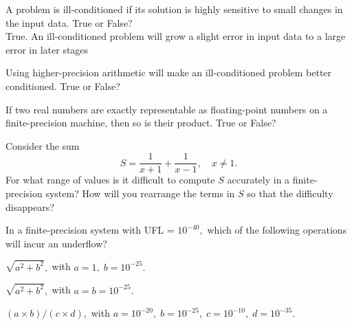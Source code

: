 \item
\benum
\item A problem is ill-conditioned if its solution is highly sensitive to small changes in the input data.  True or False? \\
	True. An ill-conditioned problem will grow a slight error in input data to a large error in later stages

\item Using higher-precision arithmetic will make an ill-conditioned problem better conditioned.  True or False?
\item  If two real numbers are exactly representable as floating-point numbers on a finite-precision machine, then so is their product.  True or False?
\item  Consider the sum
\[
S = \frac{1}{x+1} + \frac{1}{x-1}, \quad x \ne 1.
\]
For what range of values is it difficult to compute $S$ accurately in a finite-precision system?  How will you rearrange the terms in $S$ so that the difficulty disappears?
\item In a finite-precision system with UFL = $10^{-40},$ which of the following operations will incur an underflow?
\benum
\item $\sqrt{a^2+b^2},$ with $a=1, \; b=10^{-25}.$
\item $\sqrt{a^2+b^2},$ with $a=b=10^{-25}.$
\item $(a\times b)/(c \times d),$ with $a=10^{-20}, \; b=10^{-25}, \; c=10^{-10}, \; d=10^{-35}.$
\eenum

\eenum

\eenum

